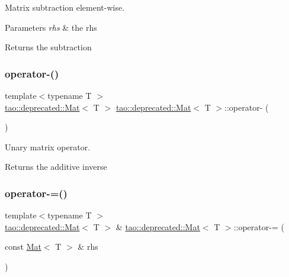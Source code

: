 Matrix subtraction element-\/wise. 


\begin{DoxyParams}{Parameters}
{\em rhs} & the rhs \\
\hline
\end{DoxyParams}
\begin{DoxyReturn}{Returns}
the subtraction 
\end{DoxyReturn}
\mbox{\label{classtao_1_1deprecated_1_1_mat_a1c7c0fe3e4ea42e4b96f3571ba29fef4}} 
\subsubsection{\texorpdfstring{operator-\/()}{operator-()}\hspace{0.1cm}{\footnotesize\ttfamily [2/2]}}
{\footnotesize\ttfamily template$<$typename T $>$ \\
\mbox{\hyperlink{classtao_1_1deprecated_1_1_mat}{tao\+::deprecated\+::\+Mat}}$<$ T $>$ \mbox{\hyperlink{classtao_1_1deprecated_1_1_mat}{tao\+::deprecated\+::\+Mat}}$<$ T $>$\+::operator-\/ (\begin{DoxyParamCaption}{ }\end{DoxyParamCaption})}



Unary matrix operator. 

\begin{DoxyReturn}{Returns}
the additive inverse 
\end{DoxyReturn}
\mbox{\label{classtao_1_1deprecated_1_1_mat_a53cd106223356bc58d686b6608af212b}} 
\subsubsection{\texorpdfstring{operator-\/=()}{operator-=()}}
{\footnotesize\ttfamily template$<$typename T $>$ \\
\mbox{\hyperlink{classtao_1_1deprecated_1_1_mat}{tao\+::deprecated\+::\+Mat}}$<$ T $>$ \& \mbox{\hyperlink{classtao_1_1deprecated_1_1_mat}{tao\+::deprecated\+::\+Mat}}$<$ T $>$\+::operator-\/= (\begin{DoxyParamCaption}\item[{const \mbox{\hyperlink{classtao_1_1deprecated_1_1_mat}{Mat}}$<$ T $>$ \&}]{rhs }\end{DoxyParamCaption})}



